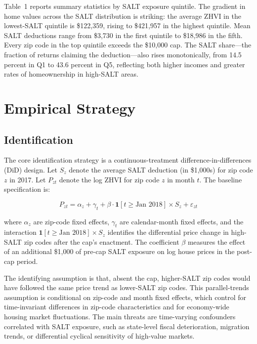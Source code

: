 \documentclass[12pt]{article}
\begin{document}
Table~1 reports summary statistics by SALT exposure quintile. The gradient in home values across the SALT distribution is striking: the average ZHVI in the lowest-SALT quintile is \$122,359, rising to \$421,957 in the highest quintile. Mean SALT deductions range from \$3,730 in the first quintile to \$18,986 in the fifth. Every zip code in the top quintile exceeds the \$10,000 cap. The SALT share---the fraction of returns claiming the deduction---also rises monotonically, from 14.5 percent in Q1 to 43.6 percent in Q5, reflecting both higher incomes and greater rates of homeownership in high-SALT areas.



\section{Empirical Strategy}

\subsection{Identification}

The core identification strategy is a continuous-treatment difference-in-differences (DiD) design. Let $S_z$ denote the average SALT deduction (in \$1,000s) for zip code $z$ in 2017. Let $P_{zt}$ denote the log ZHVI for zip code $z$ in month $t$. The baseline specification is:

\begin{equation}
P_{zt} = \alpha_z + \gamma_t + \beta \cdot \mathbf{1}[t \geq \text{Jan 2018}] \times S_z + \varepsilon_{zt}
\label{eq:baseline}
\end{equation}

where $\alpha_z$ are zip-code fixed effects, $\gamma_t$ are calendar-month fixed effects, and the interaction $\mathbf{1}[t \geq \text{Jan 2018}] \times S_z$ identifies the differential price change in high-SALT zip codes after the cap's enactment. The coefficient $\beta$ measures the effect of an additional \$1,000 of pre-cap SALT exposure on log house prices in the post-cap period.

The identifying assumption is that, absent the cap, higher-SALT zip codes would have followed the same price trend as lower-SALT zip codes. This parallel-trends assumption is conditional on zip-code and month fixed effects, which control for time-invariant differences in zip-code characteristics and for economy-wide housing market fluctuations. The main threats are time-varying confounders correlated with SALT exposure, such as state-level fiscal deterioration, migration trends, or differential cyclical sensitivity of high-value markets.
\end{document}
